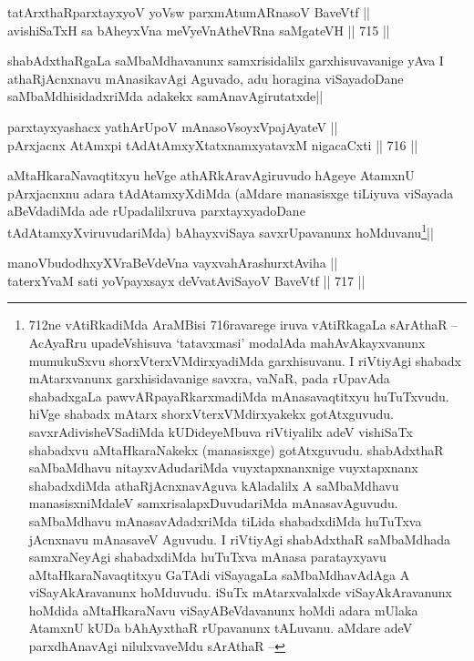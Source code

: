 \begin{shl}
tatArxthaRparxtayxyoV yoV\s sw parxmAtumARnasoV BaveVtf || \\
avishiSaTxH sa bAheyxVna meVyeVnAtheVRna saMgateVH ||  715 ||  
\end{shl}

\begin{artha} 
shabAdxthaRgaLa saMbaMdhavanunx samxrisidalilx garxhisuvavanige yAva I 
athaRjAcnxnavu mAnasikavAgi Aguvado, adu horagina viSayadoDane 
saMbaMdhisidadxriMda adakekx samAnavAgirutatxde||
\end{artha}

\begin{shl}
parxtayxyashacx yathArUpoV mAnasoV\s soyxVpajAyateV || \\
pArxjacnx AtAmx\s pi tAdAtAmxyXtatxnamxyatavxM nigacaCxti ||  716 ||  
\end{shl}

\begin{artha} 
aMtaHkaraNavaqtitxyu heVge athARkAravAgiruvudo hAgeye AtamxnU 
pArxjacnxnu adara tAdAtamxyXdiMda (aMdare manasisxge tiLiyuva viSayada 
aBeVdadiMda ade rUpadalilxruva parxtayxyadoDane 
tAdAtamxyXviruvudariMda) bAhayxviSaya savxrUpavanunx 
hoMduvanu\footnote[1]{712ne vAtiRkadiMda AraMBisi 716ravarege iruva 
vAtiRkagaLa sArAthaR -- AcAyaRru upadeVshisuva `tatavxmasi' modalAda 
mahAvAkayxvanunx mumukuSxvu shorxVterxVMdirxyadiMda garxhisuvanu. I 
riVtiyAgi shabadx mAtarxvanunx garxhisidavanige savxra, vaNaR, pada 
rUpavAda shabadxgaLa pawvARpayaRkarxmadiMda mAnasavaqtitxyu 
huTuTxvudu. hiVge shabadx mAtarx shorxVterxVMdirxyakekx gotAtxguvudu. 
savxrAdivisheVSadiMda kUDideyeMbuva riVtiyalilx adeV vishiSaTx 
shabadxvu aMtaHkaraNakekx (manasisxge) gotAtxguvudu. shabAdxthaR 
saMbaMdhavu nitayxvAdudariMda vuyxtapxnanxnige vuyxtapxnanx 
shabadxdiMda athaRjAcnxnavAguva kAladalilx A saMbaMdhavu 
manasisxniMdaleV samxrisalapxDuvudariMda mAnasavAguvudu. saMbaMdhavu 
mAnasavAdadxriMda tiLida shabadxdiMda huTuTxva jAcnxnavu mAnasaveV 
Aguvudu. I riVtiyAgi shabAdxthaR saMbaMdhada samxraNeyAgi shabadxdiMda 
huTuTxva mAnasa paratayxyavu aMtaHkaraNavaqtitxyu GaTAdi viSayagaLa 
saMbaMdhavAdAga A viSayAkAravanunx hoMduvudu. iSuTx mAtarxvalalxde 
viSayAkAravanunx hoMdida aMtaHkaraNavu viSayABeVdavanunx hoMdi adara 
mUlaka AtamxnU kUDa bAhAyxthaR rUpavanunx tALuvanu. aMdare adeV 
parxdhAnavAgi nilulxvaveMdu sArAthaR --}||
\end{artha}

\begin{shl}
manoVbudodhxyXVraBeVdeVna vayxvahArashurxtAviha || \\
taterxYvaM sati yoVpayxsayx deVvatAviSayoV BaveVtf ||  717 ||  
\end{shl}
				

